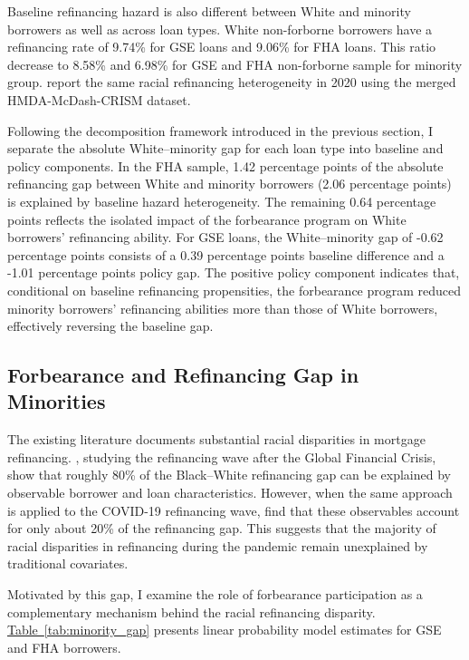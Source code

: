 \documentclass[11pt]{article}
\begin{document}
{Baseline refinancing hazard is also different between White and minority borrowers as well as across loan types. White non-forborne borrowers have a refinancing rate of 9.74\% for GSE loans and 9.06\% for FHA loans. This ratio decrease to 8.58\% and 6.98\% for GSE and FHA non-forborne sample for minority group. \citet{gerardi2021racial} report the same racial refinancing heterogeneity in 2020 using the merged HMDA-McDash-CRISM dataset.
 

Following the decomposition framework introduced in the previous section, I separate the absolute White–minority gap for each loan type into baseline and policy components. In the FHA sample, 1.42 percentage points of the absolute refinancing gap between White and minority borrowers (2.06 percentage points) is explained by baseline hazard heterogeneity. The remaining 0.64 percentage points reflects the isolated impact of the forbearance program on White borrowers’ refinancing ability.   For GSE loans, the White–minority gap of -0.62 percentage points consists of a 0.39 percentage points baseline difference and a -1.01 percentage points policy gap. The positive policy component indicates that, conditional on baseline refinancing propensities, the forbearance program reduced minority borrowers’ refinancing abilities more than those of White borrowers, effectively reversing the baseline gap. 

\subsection{Forbearance and Refinancing Gap in Minorities}
\label{sec:forbearance_minorities}

The existing literature documents substantial racial disparities in mortgage refinancing. \citet{gerardi2023mortgage}, studying the refinancing wave after the Global Financial Crisis, show that roughly 80\% of the Black--White refinancing gap can be explained by observable borrower and loan characteristics. However, when the same approach is applied to the COVID-19 refinancing wave, \citet{gerardi2021racial} find that these observables account for only about 20\% of the refinancing gap. This suggests that the majority of racial disparities in refinancing during the pandemic remain unexplained by traditional covariates.   

Motivated by this gap, I examine the role of forbearance participation as a complementary mechanism behind the racial refinancing disparity. \hyperref[tab:minority_gap]{Table~\ref*{tab:minority_gap}} presents linear probability model estimates for GSE and FHA borrowers.  

}
\end{document}
